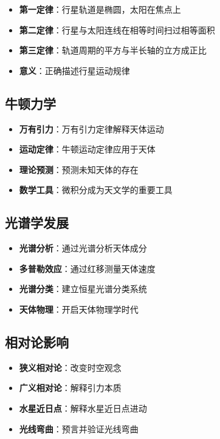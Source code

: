 \documentclass[12pt,UTF8]{ctexbook}
\begin{document}
\begin{itemize}
  \item \textbf{第一定律}：行星轨道是椭圆，太阳在焦点上
  \item \textbf{第二定律}：行星与太阳连线在相等时间扫过相等面积
  \item \textbf{第三定律}：轨道周期的平方与半长轴的立方成正比
  \item \textbf{意义}：正确描述行星运动规律
\end{itemize}

\subsection{牛顿力学}

\begin{itemize}
  \item \textbf{万有引力}：万有引力定律解释天体运动
  \item \textbf{运动定律}：牛顿运动定律应用于天体
  \item \textbf{理论预测}：预测未知天体的存在
  \item \textbf{数学工具}：微积分成为天文学的重要工具
\end{itemize}

\subsection{光谱学发展}

\begin{itemize}
  \item \textbf{光谱分析}：通过光谱分析天体成分
  \item \textbf{多普勒效应}：通过红移测量天体速度
  \item \textbf{光谱分类}：建立恒星光谱分类系统
  \item \textbf{天体物理}：开启天体物理学时代
\end{itemize}

\subsection{相对论影响}

\begin{itemize}
  \item \textbf{狭义相对论}：改变时空观念
  \item \textbf{广义相对论}：解释引力本质
  \item \textbf{水星近日点}：解释水星近日点进动
  \item \textbf{光线弯曲}：预言并验证光线弯曲
\end{itemize}
\end{document}
